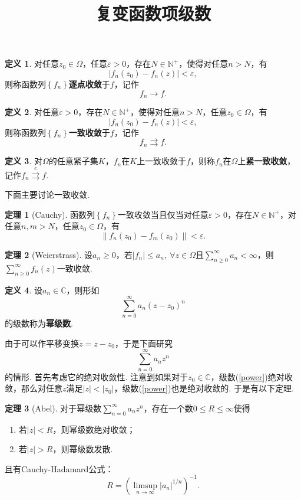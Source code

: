 \documentclass[12pt]{ctexart}
\title{\vspace{-2em}\textbf{复变函数项级数}\vspace{-2em}}
\date{ }
\theoremstyle{definition}
\newtheorem{definition}{定义}
\newtheorem{theorem}{定理}
\theoremstyle{plain}
\begin{document}
	\maketitle
	\begin{definition}
		对任意$z_0\in\varOmega$，任意$\varepsilon>0$，存在$N\in\mathbb{N}^+$，使得对任意$n>N$，有
		$$\left|f_n(z_0)-f_n(z)\right|<\varepsilon,$$
		则称函数列$\left\{f_n\right\}$\textbf{逐点收敛}于$f$，记作
		$$f_n\rightarrow f.$$
	\end{definition}
	\begin{definition}
		对任意$\varepsilon>0$，存在$N\in\mathbb{N}^+$，使得对任意$n>N$，任意$z_0\in\varOmega$，有
		$$\left|f_n(z_0)-f_n(z)\right|<\varepsilon,$$
		则称函数列$\left\{f_n\right\}$\textbf{一致收敛}于$f$，记作
		$$f_n\rightrightarrows f.$$
	\end{definition}
	\begin{definition}
		对$\varOmega$的任意紧子集$K$，$f_n$在$K$上一致收敛于$f$，则称$f_n$在$\varOmega$上\textbf{紧一致收敛}，记作$f_n\stackrel{c}{\rightrightarrows}f$.
	\end{definition}
	下面主要讨论一致收敛.
	\begin{theorem}[Cauchy]
		函数列$\left\{f_n\right\}$一致收敛当且仅当对任意$\varepsilon>0$，存在$N\in\mathbb{N}^+$，对任意$n,m>N$，任意$z_0\in\varOmega$，有
		$$\left\|f_n(z_0)-f_m(z_0)\right\|<\varepsilon.$$
	\end{theorem}
	\begin{theorem}[Weierstrass]
		设$a_n\geqslant 0$，若$|f_n|\leqslant a_n,\ \forall z\in\varOmega$且$\sum_{n\geqslant 0}^{\infty}a_n<\infty$，则$\sum_{n\geqslant 0}^{\infty}f_n(z)$一致收敛.
	\end{theorem}
	\begin{definition}
		设$a_n\in\mathbb{C}$，则形如
		$$\sum_{n=0}^{\infty}a_n(z-z_0)^{n}$$
		的级数称为\textbf{幂级数}.
	\end{definition}
	由于可以作平移变换$\tilde{z}=z-z_0$，于是下面研究
	\begin{equation}\label{power}
		\sum_{n=0}^{\infty}a_nz^n
	\end{equation}
	的情形. 首先考虑它的绝对收敛性. 注意到如果对于$z_0\in\mathbb{C}$，级数(\ref{power})绝对收敛，那么对任意$z$满足$|z|<|z_0|$，级数(\ref{power})也是绝对收敛的. 于是有以下定理.
	\begin{theorem}[Abel]
		对于幂级数$\sum_{n=0}^{\infty}a_nz^n$，存在一个数$0\leqslant R\leqslant\infty$使得
		\begin{enumerate}
			\item 若$|z|<R$，则幂级数绝对收敛；
			\item 若$|z|>R$，则幂级数发散.
		\end{enumerate}
		且有Cauchy-Hadamard公式：
		$$R=\left(\limsup_{n\to\infty}|a_n|^{1/n}\right)^{-1}.$$
	\end{theorem}
\end{document}

